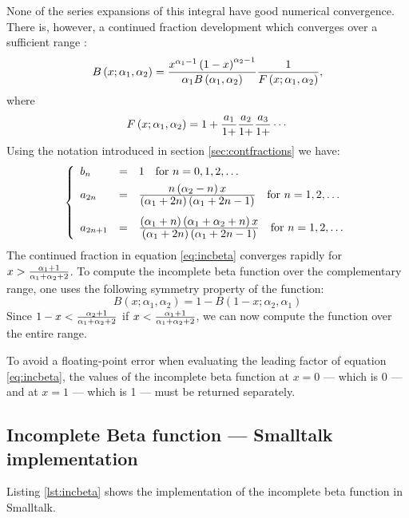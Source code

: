None of the series expansions of this integral have good numerical
convergence. There is, however, a continued fraction development
which converges over a sufficient range \cite{AbrSteg}:
\begin{equation}
\label{eq:incbeta}
  B\left(x;\alpha_1,\alpha_2\right)={x^{\alpha_1-1}\left(1-x\right)^{\alpha_2-1}\over
  \alpha_1 B\left(\alpha_1,\alpha_2\right)}
  {1\over F\left(x;\alpha_1,\alpha_2\right)},
\end{equation}
where
\begin{equation}
  F\left(x;\alpha_1,\alpha_2\right)=1+
  {a_1\over 1+}{a_2\over 1+}{a_3\over 1+}\cdots
\end{equation}
Using the notation introduced in section \ref{sec:contfractions}
we have:
\begin{equation}
\label{eq:incbetaterm}
  \left\{{
  \begin{array}{lcl}
    b_n & = & 1\mbox{\quad for $n=0,1,2,\ldots$} \\*[1ex]
    a_{2n} & = & {\displaystyle n\left(\alpha_2-n\right)x \over \displaystyle\left(\alpha_1+2n\right)
    \left(\alpha_1+2n-1\right)} \mbox{\quad for $n=1,2,\ldots$} \\*[3ex]
    a_{2n+1} & = & {\displaystyle\left(\alpha_1+n\right)\left(\alpha_1+\alpha_2+n\right)x \over \displaystyle\left(\alpha_1+2n\right)
    \left(\alpha_1+2n-1\right)} \mbox{\quad for $n=1,2,\ldots$}
  \end{array}
  }\right.
\end{equation}
The continued fraction in equation \ref{eq:incbeta} converges
rapidly for $x>{\alpha_1+1 \over
\alpha_1+\alpha_2+2}$\cite{Press}. To compute the incomplete beta
function over the complementary range, one uses the following
symmetry property of the function:
\begin{equation}
  B\left(x;\alpha_1,\alpha_2\right)=1-B\left(1-x;\alpha_2,\alpha_1\right)
\end{equation}
Since $1-x<{\alpha_2+1 \over \alpha_1+\alpha_2+2}$ if
$x<{\alpha_1+1 \over \alpha_1+\alpha_2+2}$, we can now compute the
function over the entire range.

To avoid a floating-point error when evaluating the leading factor
of equation \ref{eq:incbeta}, the values of the incomplete beta
function at $x=0$ --- which is 0 --- and at $x=1$ --- which is 1
--- must be returned separately.

\subsection{Incomplete Beta function --- Smalltalk  implementation}
Listing \ref{lst:incbeta} shows the implementation of the
incomplete beta function in Smalltalk.

